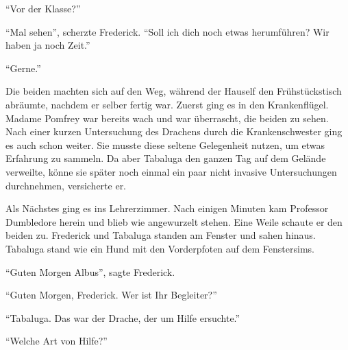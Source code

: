 \enquote{Vor der Klasse?}

\enquote{Mal sehen}, scherzte Frederick. \enquote{Soll ich dich noch etwas herumführen? Wir haben ja noch Zeit.}

\enquote{Gerne.}

Die beiden machten sich auf den Weg, während der Hauself den Frühstückstisch abräumte, nachdem er selber fertig war. Zuerst ging es in den Krankenflügel. Madame Pomfrey war bereits wach und war überrascht, die beiden zu sehen. Nach einer kurzen Untersuchung des Drachens durch die Krankenschwester ging es auch schon weiter. Sie musste diese seltene Gelegenheit nutzen, um etwas Erfahrung zu sammeln. Da aber Tabaluga den ganzen Tag auf dem Gelände verweilte, könne sie später noch einmal ein paar nicht invasive Untersuchungen durchnehmen, versicherte er.

Als Nächstes ging es ins Lehrerzimmer. Nach einigen Minuten kam Professor Dumbledore herein und blieb wie angewurzelt stehen. Eine Weile schaute er den beiden zu. Frederick und Tabaluga standen am Fenster und sahen hinaus. Tabaluga stand wie ein Hund mit den Vorderpfoten auf dem Fenstersims.




 \enquote{Guten Morgen Albus}, sagte Frederick.

\enquote{Guten Morgen, Frederick. Wer ist Ihr Begleiter?}

\enquote{Tabaluga. Das war der Drache, der um Hilfe ersuchte.}

\enquote{Welche Art von Hilfe?}

